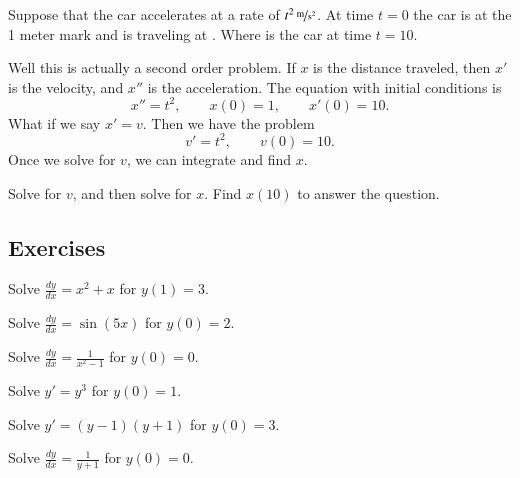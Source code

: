 \documentclass[12pt]{book}
\begin{document}
\begin{example}
Suppose that the car accelerates at a rate of $\unitfrac[t^2]{m}{s^2}$.
At time $t=0$ the car is at the 1 meter mark and is traveling at
.  Where is the car at time $t=10$.

Well this is actually a second order problem.  If $x$ is the distance
traveled, then $x'$ is the velocity, and $x''$ is the acceleration.
The equation with initial conditions is
\begin{equation*}
x'' = t^2 , \qquad x(0) = 1 , \qquad x'(0) = 10 .
\end{equation*}
What if we say $x' = v$.  Then we have the problem
\begin{equation*}
v' = t^2, \qquad v(0) = 10 .
\end{equation*}
Once we solve for $v$, we can integrate and find $x$.
\end{example}

\begin{exercise}
Solve for $v$, and then solve for $x$.  Find $x(10)$ to answer the
question.
\end{exercise}

\subsection{Exercises}

\begin{exercise}
Solve $\frac{dy}{dx} = x^2+x$ for $y(1)=3$.
\end{exercise}

\begin{exercise}
Solve $\frac{dy}{dx} = \sin (5x)$ for $y(0)=2$.
\end{exercise}

\begin{exercise}
Solve $\frac{dy}{dx} = \frac{1}{x^2-1}$ for $y(0)=0$.
\end{exercise}

\begin{exercise}
Solve $y' = y^3$ for $y(0)=1$.
\end{exercise}

\begin{exercise}
Solve $y' = (y-1)(y+1)$ for $y(0)=3$.
\end{exercise}

\begin{exercise}
Solve $\frac{dy}{dx} = \frac{1}{y+1}$ for $y(0)=0$.
\end{exercise}
\end{document}

